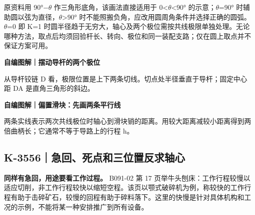 \documentclass[zihao=5,a4paper,UTF8,fontset=fandol]{ctexart}
\begin{document}
原资料用 90°$-$$\theta$ 作三角形底角，该画法直接适用于 0<$\theta$<90° 的示意；$\theta$=90° 时辅助圆以弦为直径，$\theta$>90° 时不能照搬负角，应改用圆周角条件并选择正确的圆弧。$\theta$=0 即 K=1 时圆半径趋于无穷大，轴心及两个极位需按共线极限单独处理。无论哪种方法，取点后均须回验杆长、转向、极位和同一装配支路；仅在圆上取点并不保证方案可用。


\textbf{自编图解｜摆动导杆的两个极位}


\begin{center}\end{center}


从导杆铰链 D 看，极限位置是上下两条切线。切点处半径垂直于导杆；固定中心距 DA 是直角三角形的斜边。




\textbf{自编图解｜偏置滑块：先画两条平行线}


\begin{center}\end{center}


两条实线表示两次共线极位时轴心到滑块销的距离。用较大距离减较小距离得到两倍曲柄长；它通常不等于导路上的行程 h。





\subsection{K-3556｜急回、死点和三位置反求轴心}
\label{k-3556}

\textbf{同样有急回，用途要看工作过程。} B091-02 第 17 页举牛头刨床：工作行程较慢以适应切削，非工作行程较快以缩短空程。该页以颚式破碎机为例，称较快的工作行程有助于击碎矿石，较慢的回程有助于碎料落下。这里的快慢是针对具体机构和工况的示例，不能将某一种安排推广到所有设备。
\end{document}
